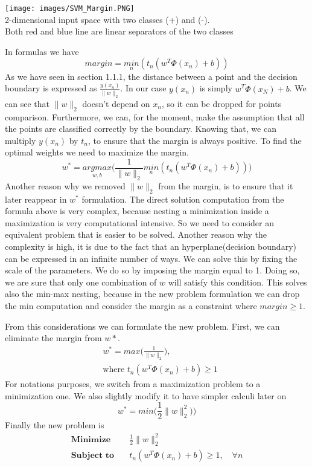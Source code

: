 \documentclass[../main.tex]{subfiles}
\begin{document}
\begin{center}
    \texttt{[image: images/SVM\_Margin.PNG]} \\
    2-dimensional input space with two classes (+) and (-). \\
    Both red and blue line are linear separators of the two classes
\end{center}
In formulas we have
\begin{equation}
    margin = \underset{n}{min} (t_n (w^T \Phi(x_n) + b))
\end{equation}
As we have seen in section 1.1.1, the distance between a point and the decision boundary is expressed as $\frac{y(x_n)}{\|w\|_2}$. In our case $y(x_n)$ is simply $w^T\Phi(x_N) + b$. We can see that $\|w\|_2$ doesn't depend on $x_n$, so it can be dropped for points comparison. Furthermore, we can, for the moment, make the assumption that all the points are classified correctly by the boundary. Knowing that, we can multiply $y(x_n)$ by $t_n$, to ensure that the margin is always positive.
\newline
To find the optimal weights we need to maximize the margin.
\begin{equation*}
    w^* = \underset{w,b}{argmax} \bigg( \frac{1}{\|w\|_2} \underset{n}{min} (t_n (w^T \Phi(x_n) + b)) \bigg)
\end{equation*}
Another reason why we removed $\|w\|_2$ from the margin, is to ensure that it later reappear in $w^*$ formulation.
The direct solution computation from the formula above is very complex, because nesting a minimization inside a maximization is very computational intensive. So we need to consider an equivalent problem that is easier to be solved. Another reason why the complexity is high, it is due to the fact that an hyperplane(decision boundary) can be expressed in an infinite number of ways\footnotemark. We can solve this by fixing the scale of the parameters. We do so by imposing the margin equal to 1. Doing so, we are sure that only one combination of $w$ will satisfy this condition. This solves also the min-max nesting, because in the new problem formulation we can drop the min computation and consider the margin as a constraint where $margin \geq 1$.

From this considerations we can formulate the new problem. First, we can eliminate the margin from $w*$.
\begin{align*}
     & w^* = max \bigg( \frac{1}{\|w\|_2} \bigg),   \\
     & \text{where } t_n (w^T \Phi(x_n) + b) \geq 1
\end{align*}
For notations purposes, we switch from a maximization problem to a minimization one. We also slightly modify it to have simpler calculi later on
\begin{equation*}
    w^* = min \bigg( \frac{1}{2} \|w\|_2^2) \bigg)
\end{equation*}
Finally the new problem is
\begin{align*}
    \textbf{Minimize} \quad   & \frac{1}{2} \|w\|_2^2                           \\
    \textbf{Subject to} \quad & t_n (w^T \Phi(x_n) + b) \geq 1, \quad \forall n
\end{align*}
\end{document}

